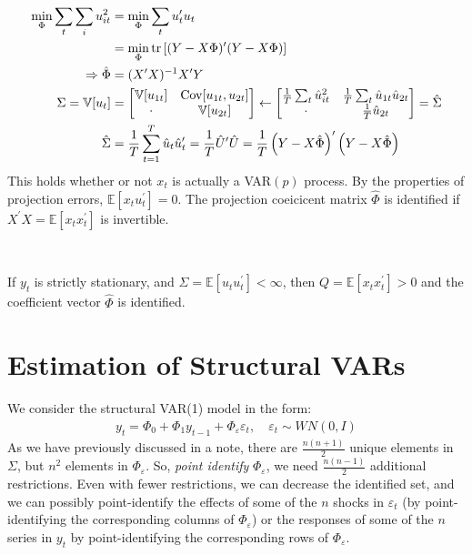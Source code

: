 \begin{align*}
    \min_{\Phi} \sum_{t} \sum_{i} u_{it}^2 &= \min_{\Phi} \sum_{t} u_t^{\prime} u_t \\
    &= \min_{\Phi} \operatorname{tr}\left[ (Y - X\Phi)^{\prime} (Y - X\Phi) \right] \\
    \Rightarrow \hat{\Phi} &= (X^{\prime} X)^{-1} X^{\prime} Y \\
    \Sigma = \mathbb{V}[u_t] &= \begin{bmatrix}
        \mathbb{V}[u_{1t}] & \operatorname{Cov}[u_{1t}, u_{2t}] \\
        \cdot &  \mathbb{V}[u_{2t}] \\
    \end{bmatrix} \leftarrow \begin{bmatrix}
        \frac{1}{T} \sum_{t} \hat{u}_{it}^2 & \frac{1}{T} \sum_{t} \hat{u}_{1t} \hat{u}_{2t} \\
        \cdot & \frac{1}{T} \hat{u}_{2t} \\
    \end{bmatrix} = \hat{\Sigma} \\
    \hat{\Sigma} &= \frac{1}{T} \sum_{t=1}^{T} \hat{u}_t \hat{u}_t^{\prime} = \frac{1}{T} \hat{U}^{\prime} \hat{U} = \frac{1}{T} \left(Y - X \hat{\Phi} \right)^{\prime} \left(Y - X \hat{\Phi} \right)
\end{align*}
This holds whether or not $x_t$ is actually a VAR$(p)$ process.
By the properties of projection errors, $\mathbb{E}[x_t u_t^{\prime}] = 0$.
The projection coeicicent matrix $\hat{\Phi}$ is identified if $X^{\prime} X = \mathbb{E}[x_t x_t^{\prime}]$ is invertible.
\begin{theorem}\label{thm:identification-svar}
    \

    If $y_t$ is strictly stationary, and $\Sigma = \mathbb{E}[u_t u_t^{\prime}] < \infty$,
    then $Q = \mathbb{E}[x_t x_t^{\prime}] > 0$ and the coefficient vector
    $\hat{\Phi}$ is identified.
\end{theorem}


\section{Estimation of Structural VARs}
\label{sec:estimation-structural-var}

We  consider the structural VAR(1) model in the form:
\begin{gather*}
    y_t = \Phi_0 + \Phi_1 y_{t-1} + \Phi_{\varepsilon} \varepsilon_t, \quad \varepsilon_t \sim WN(0, I)
\end{gather*}
As we have previously discussed in a note, there are $\frac{n(n+1)}{2}$ unique elements in $\Sigma$, but $n^2$ elements in $\Phi_{\varepsilon}$.
So, \textit{point identify} $\Phi_{\varepsilon}$, we need $\frac{n(n-1)}{2}$ additional restrictions.
Even with fewer restrictions, we can decrease the identified set, and we can possibly point-identify the effects of some of the $n$ shocks in $\varepsilon_t$
(by point-identifying the corresponding columns of $\Phi_{\varepsilon}$) or the responses of some of the $n$ series in $y_t$ by point-identifying the corresponding rows of $\Phi_{\varepsilon}$.

